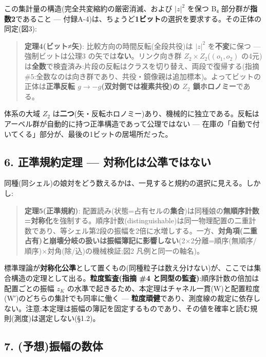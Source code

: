 \documentclass[
]{ltjsarticle}
\begin{document}
この集計量の構造(完全共変縮約の厳密消滅、および \(|z|^2\) を保つ B₄
部分群が\textbf{指数2}であること ---
付録A-4)は、ちょうど\textbf{1ビット}の選択を要求する。その正体の同定(図3):

\begin{quote}
\textbf{定理4(ビット≠矢)}: 比較方向の時間反転(全段共役)は \(|z|^2\)
を\textbf{不変}に保つ --- 強制ビットは公理3
の矢では\textbf{ない}。リンク向き群 \(Z_2\times Z_2\)(\((o_1,o_2)\)
の4元)は\textbf{全数}で検査済み:片段の反転はクラスを切り替え、両段で復帰する(指摘
\#5:全数なのは向き群であり、共役・鏡像親は追加標本)。よってビットの正体は\textbf{正準反転
\(g\to-g\)(双対側では複素共役)の \(Z_2\) 鎖ホロノミー}である。
\end{quote}

体系の大域 \(Z_2\)
は\textbf{二つ}(矢・反転ホロノミー)あり、機械的に独立である。反転はアーベル群が自動的に持つ正準構造であって公理ではない
--- 在庫の「自動で付いてくる」部分が、最後の1ビットの居場所だった。

\subsection{6. 正準規約定理 ---
対称化は公準ではない}\label{ux6b63ux6e96ux898fux7d04ux5b9aux7406-ux5bfeux79f0ux5316ux306fux516cux6e96ux3067ux306fux306aux3044}

同種(同シェル)の娘対をどう数えるかは、一見すると規約の選択に見える。しかし:

\begin{quote}
\textbf{定理5(正準規約)}:
配置読み(状態=占有セルの\textbf{集合})は同種娘の\textbf{無順序計数=対称化}を強制する。順序計数(distinguishable)は同一物理配置の二重計数であり、等シェル第2段の振幅を2倍に水増しする。一方、\textbf{対角項(二重占有)と崩壊分岐の扱いは振幅簿記に影響しない}(2×2分離=順序(無順序/順序)×対角(除/込)の機械検証;図2
凡例と同一の軸名)。
\end{quote}

標準理論が\textbf{対称化公準}として置くもの(同種粒子は数え分けない)が、ここでは集合構造の定理として出る。\textbf{粒度監査(指摘
\#4 と同型の監査)}:順序計数の倍加は配置ごとの振幅 \(z_K\)
の水準で起きるため、本定理はチャネル一貫(W)と配置粒度(W′)のどちらの集計でも同率に働く
---
\textbf{粒度頑健}であり、測度線の裁定に依存しない。注意:本定理は振幅の簿記を固定するものであり、その値を確率と読む規則(測度)は選定しない(§1.2)。

\subsection{7.
(予想)振幅の数体}\label{ux4e88ux60f3ux632fux5e45ux306eux6570ux4f53}
\end{document}
